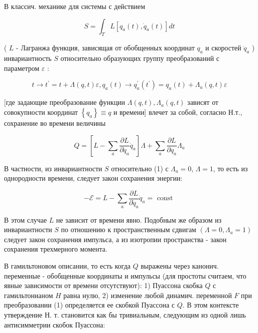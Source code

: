 \documentclass[10pt]{article}
\begin{document}
В классич. механике для системы с действием



\[

S=\int_{T} L\left[q_{a}(t), \dot{q}_{a}(t)\right] d t

\]



( $L$ - Лагранжа функция, зависящая от обобщенных координат $q_{a}$ и скоростей $\dot{q}_{a}$ ) инвариантность $S$ относительно образующих группу преобразований с параметром $\varepsilon$ :



\[

t \rightarrow t^{\prime}=t+\Lambda(q, t) \varepsilon, q_{a}(t) \rightarrow q_{a}^{\prime}\left(t^{\prime}\right)=q_{a}(t)+\Lambda_{a}(q, t) \varepsilon

\]



[где задающие преобразование функции $\Lambda(q, t), \Lambda_{a}(q, t)$ зависят от совокупности координат $\left\{q_{a}\right\} \equiv q$ и времени] влечет за собой, согласно Н.т., сохранение во времени величины



\[

Q=\left[L-\sum_{a} \frac{\partial L}{\partial \dot{q}_{a}} \dot{q}_{a}\right] \Lambda+\sum_{a} \frac{\partial L}{\partial q_{a}} \Lambda_{a}

\]



В частности, из инвариантности $S$ относительно (1) с $\Lambda_{a}=0$, $\Lambda=1$, то есть из однородности времени, следует закон сохранения энергии:



\[

-\mathscr{E}=L-\sum_{a} \frac{\partial L}{\partial \dot{q}_{a}} \dot{q}_{a}=\text { const }

\]



В этом случае $L$ не зависит от времени явно. Подобным же образом из инвариантности $S$ по отношению к пространственным сдвигам $\left(\Lambda=0, \Lambda_{a}=1\right)$ следует закон сохранения импульса, а из изотропии пространства - закон сохранения трехмерного момента.



В гамильтоновом описании, то есть когда $Q$ выражены через канонич. переменные - обобщенные координаты и импульсы (для простоты считаем, что явные зависимости от времени отсутствуют): 1) Пуассона скобка $Q$ с гамильтонианом $H$ равна нулю, 2) изменение любой динамич. переменной $F$ при преобразовании (1) определяется ее скобкой Пуассона с $Q$. В этом контексте утверждение Н. т. становится как бы тривиальным, следующим из одной лишь антисимметрии скобок Пуассона:
\end{document}
